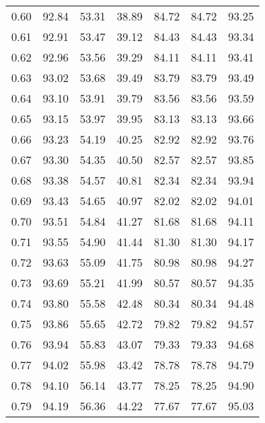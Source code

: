 \begin{tabular}{|c|c|c|c|c|c|c|}
      0.60 &     92.84 &     53.31 &      38.89 &   84.72 &      84.72 &         93.25 \\
      0.61 &     92.91 &     53.47 &      39.12 &   84.43 &      84.43 &         93.34 \\
      0.62 &     92.96 &     53.56 &      39.29 &   84.11 &      84.11 &         93.41 \\
      0.63 &     93.02 &     53.68 &      39.49 &   83.79 &      83.79 &         93.49 \\
      0.64 &     93.10 &     53.91 &      39.79 &   83.56 &      83.56 &         93.59 \\
      0.65 &     93.15 &     53.97 &      39.95 &   83.13 &      83.13 &         93.66 \\
      0.66 &     93.23 &     54.19 &      40.25 &   82.92 &      82.92 &         93.76 \\
      0.67 &     93.30 &     54.35 &      40.50 &   82.57 &      82.57 &         93.85 \\
      0.68 &     93.38 &     54.57 &      40.81 &   82.34 &      82.34 &         93.94 \\
      0.69 &     93.43 &     54.65 &      40.97 &   82.02 &      82.02 &         94.01 \\
      0.70 &     93.51 &     54.84 &      41.27 &   81.68 &      81.68 &         94.11 \\
      0.71 &     93.55 &     54.90 &      41.44 &   81.30 &      81.30 &         94.17 \\
      0.72 &     93.63 &     55.09 &      41.75 &   80.98 &      80.98 &         94.27 \\
      0.73 &     93.69 &     55.21 &      41.99 &   80.57 &      80.57 &         94.35 \\
      0.74 &     93.80 &     55.58 &      42.48 &   80.34 &      80.34 &         94.48 \\
      0.75 &     93.86 &     55.65 &      42.72 &   79.82 &      79.82 &         94.57 \\
      0.76 &     93.94 &     55.83 &      43.07 &   79.33 &      79.33 &         94.68 \\
      0.77 &     94.02 &     55.98 &      43.42 &   78.78 &      78.78 &         94.79 \\
      0.78 &     94.10 &     56.14 &      43.77 &   78.25 &      78.25 &         94.90 \\
      0.79 &     94.19 &     56.36 &      44.22 &   77.67 &      77.67 &         95.03 \\

\end{tabular}
